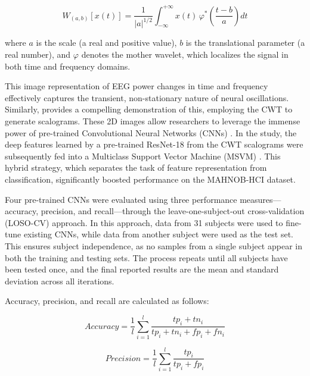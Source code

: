 \documentclass[conference]{IEEEtran}
\begin{document}
\begin{equation}
W_{(a,b)}[x(t)] = \frac{1}{|a|^{1/2}} \int_{-\infty}^{+\infty} x(t)\,\varphi^{*}\!\left(\frac{t - b}{a}\right) dt
\end{equation}

where \(a\) is the scale (a real and positive value), \(b\) is the translational parameter (a real number), and \(\varphi\) denotes the mother wavelet, which localizes the signal in both time and frequency domains.

This image representation of EEG power changes in time and frequency effectively captures the transient, non-stationary nature of neural oscillations. Similarly, \cite{Bagherzadeh2023HybridEEGWaveletCNN_SVM} provides a compelling demonstration of this, employing the CWT to generate scalograms. These 2D images allow researchers to leverage the immense power of pre-trained Convolutional Neural Networks (CNNs) \cite{Bagherzadeh2023HybridEEGWaveletCNN_SVM}. In the study, the deep features learned by a pre-trained ResNet-18 from the CWT scalograms were subsequently fed into a Multiclass Support Vector Machine (MSVM) \cite{Bagherzadeh2023HybridEEGWaveletCNN_SVM}. This hybrid strategy, which separates the task of feature representation from classification, significantly boosted performance on the MAHNOB-HCI dataset.

Four pre-trained CNNs were evaluated using three performance measures—accuracy, precision, and recall—through the leave-one-subject-out cross-validation (LOSO-CV) \cite{Pauli2021BalancedLOSO} approach. In this approach, data from 31 subjects were used to fine-tune existing CNNs, while data from another subject were used as the test set. This ensures subject independence, as no samples from a single subject appear in both the training and testing sets. The process repeats until all subjects have been tested once, and the final reported results are the mean and standard deviation across all iterations.

Accuracy, precision, and recall \cite{Powers2020EvaluationArXiv} are calculated as follows:

\begin{equation}
Accuracy = \frac{1}{l} \sum_{i=1}^{l} \frac{tp_i + tn_i}{tp_i + tn_i + fp_i + fn_i}
\end{equation}

\begin{equation}
Precision = \frac{1}{l} \sum_{i=1}^{l} \frac{tp_i}{tp_i + fp_i}
\end{equation}
\end{document}
